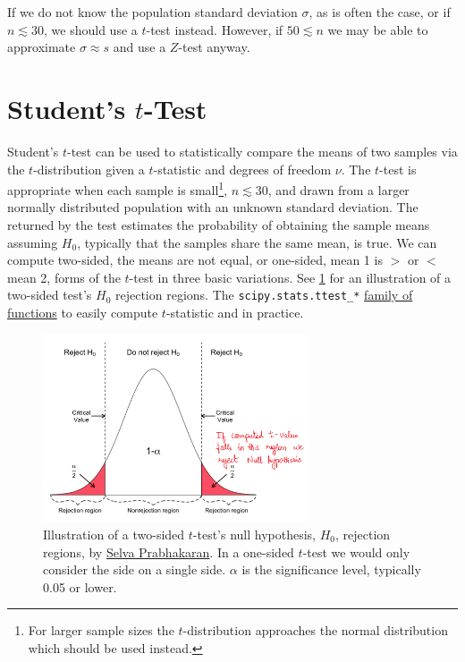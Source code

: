 If we do not know the population standard deviation $\sigma$, as is often the case,
or if $n \lesssim 30$, we should use a $t$-test instead.
However, if $50 \lesssim n$ we may be able to approximate $\sigma \approx s$
and use a $Z$-test anyway.

\section{Student's \texorpdfstring{$t$}{t}-Test}
\label{hypo:t_test}

Student's $t$-test can be used to
statistically compare the means of two samples via the $t$-distribution
given a $t$-statistic and degrees of freedom $\nu$.
The $t$-test is appropriate when each sample is small\footnote{For
larger sample sizes the $t$-distribution approaches the normal distribution which should be used instead.}, $n \lesssim 30$,
and drawn from a larger normally distributed population with an unknown standard deviation.
The \pvalue returned by the test estimates the probability of obtaining the sample means
assuming $H_{0}$, typically that the samples share the same mean, is true.
We can compute two-sided, \ie the means are not equal, or one-sided, \ie mean 1 is $>$ or $<$ mean 2,
forms of the $t$-test in three basic variations.
See \cref{fig:two_sided_t_test} for an illustration of a two-sided test's $H_{0}$ rejection regions.
The \texttt{scipy.stats.ttest\_*}
\href{https://docs.scipy.org/doc/scipy/reference/stats.html#statistical-tests}{family of functions}
to easily compute $t$-statistic and \pvalue in practice.

\begin{figure}
\centering
\includegraphics[width=0.7\textwidth]{figures/stats/one_side_t_test_rejection_regions.png}
\caption{
Illustration of a two-sided $t$-test's null hypothesis, $H_{0}$, rejection regions,
by \href{https://www.machinelearningplus.com/statistics/t-test-students-understanding-the-math-and-how-it-works/}{Selva Prabhakaran}.
In a one-sided $t$-test we would only consider the side on a single side.
$\alpha$ is the significance level, typically \num{0.05} or lower.
}
\label{fig:two_sided_t_test}
\end{figure}

